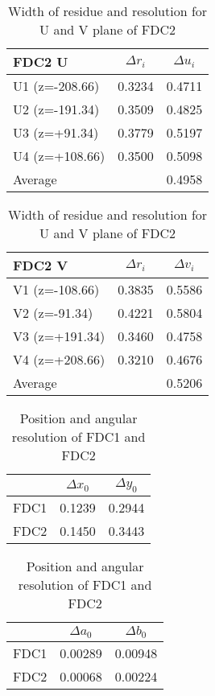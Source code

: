 \begin{table}[h]
    \centering
    \begin{tabular}{l|cc}
    \hline
       FDC2 U  & $\Delta r_i$ & $\Delta u_i$  \\
    \hline
        U1 (z=-208.66) & 0.3234 & 0.4711     \\
        U2 (z=-191.34) & 0.3509 & 0.4825     \\
        U3 (z=+91.34)  & 0.3779 & 0.5197     \\
        U4 (z=+108.66) & 0.3500 & 0.5098     \\
    \hline
    Average &        &  0.4958 \\
    \hline
    \end{tabular}
    \begin{tabular}{l|cc}
    \hline
     FDC2 V   & $\Delta r_i$ & $\Delta v_i$ \\
    \hline
         V1 (z=-108.66) & 0.3835 & 0.5586 \\
         V2 (z=-91.34)  & 0.4221 & 0.5804 \\
         V3 (z=+191.34) & 0.3460 & 0.4758 \\
         V4 (z=+208.66) & 0.3210 & 0.4676 \\
    \hline
    Average &        & 0.5206 \\
    \hline
    \end{tabular}
    \caption{Width of residue and resolution for U and V plane of FDC2}
\end{table}

\begin{table}[h]
    \centering
    \begin{tabular}{c|cc}
        \hline
                &  $\Delta x_0$ & $\Delta y_0$\\
            \hline
            FDC1 & 0.1239 & 0.2944 \\
            FDC2 &  0.1450 & 0.3443\\
            \hline
    \end{tabular}
    \begin{tabular}{c|cc}
    \hline
        & $\Delta a_0$ & $\Delta b_0$ \\
        \hline
        FDC1 & 0.00289 & 0.00948\\
        FDC2 & 0.00068 & 0.00224 \\
        \hline
    \end{tabular}
    \caption{Position and angular resolution of FDC1 and FDC2}
\end{table}